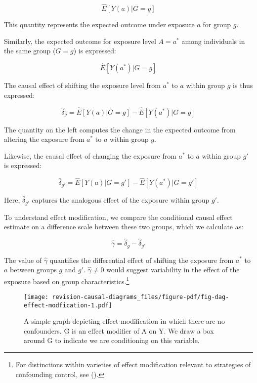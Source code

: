 \documentclass[
  singlecolumn,
  9pt]{article}
\begin{document}
\[\hat{E}[Y(a)|G=g]\]

This quantity represents the expected outcome under exposure \(a\) for
group \(g\).

Similarly, the expected outcome for exposure level \(A = a^*\) among
individuals in the same group (\(G = g\)) is expressed:

\[\hat{E}[Y(a^*)|G=g]\]

The causal effect of shifting the exposure level from \(a^*\) to \(a\)
within group \(g\) is thus expressed:

\[\hat{\delta}_g = \hat{E}[Y(a)|G=g] - \hat{E}[Y(a^*)|G=g]\]

The quantity on the left computes the change in the expected outcome
from altering the exposure from \(a^*\) to \(a\) within group \(g\).

Likewise, the causal effect of changing the exposure from \(a^*\) to
\(a\) within group \(g'\) is expressed:

\[\hat{\delta}_{g'} = \hat{E}[Y(a)|G=g'] - \hat{E}[Y(a^*)|G=g']\]

Here, \(\hat{\delta}_{g'}\) captures the analogous effect of the
exposure within group \(g'\).

To understand effect modification, we compare the conditional causal
effect estimate on a difference scale between these two groups, which we
calculate as:

\[\hat{\gamma} = \hat{\delta}_g - \hat{\delta}_{g'}\]

The value of \(\hat{\gamma}\) quantifies the differential effect of
shifting the exposure from \(a^*\) to \(a\) between groups \(g\) and
\(g'\). \(\hat{\gamma} \neq 0\) would suggest variability in the effect
of the exposure based on group characteristics.\footnote{For
  distinctions within varieties of effect modification relevant to
  strategies of confounding control, see
  ().}

\begin{figure}

{\centering \texttt{[image: revision-causal-diagrams\_files/figure-pdf/fig-dag-effect-modfication-1.pdf]}

}

\caption{\label{fig-dag-effect-modfication}A simple graph depicting
effect-modification in which there are no confounders. G is an effect
modifier of A on Y. We draw a box around G to indicate we are
conditioning on this variable.}

\end{figure}
\end{document}
